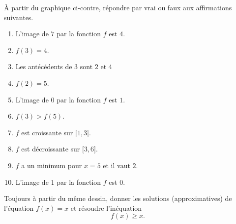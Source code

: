 
\begin{exercice}\label{exoSeconde-0069}

    \begin{multicols}{2}

À partir du graphique ci-contre, répondre par vrai ou faux aux affirmations suivantes.

\begin{enumerate}
   \item
       L'image de \( 7\) par la fonction \( f\) est \( 4\).
   \item
       \( f(3)=4\).
   \item
       Les antécédents de \( 3\) sont \( 2\) et \( 4\)
   \item
       \( f(2)=5\).
   \item
       L'image de \( 0\) par la fonction \( f\) est \( 1\).
   \item
       \( f(3)>f(5)\).
   \item
       \( f\) est croissante sur \( \mathopen[ 1 , 3 \mathclose]\).
   \item
       \( f\) est décroissante sur \( \mathopen[ 3 , 6 \mathclose]\).
    \item
        \( f\) a un minimum pour \( x=5\) et il vaut \( 2\).
    \item
       L'image de \( 1\) par la fonction \( f\) est \( 0\).
\end{enumerate}

\columnbreak




    \end{multicols}

Toujours à partir du même dessin, donner les solutions (approximatives) de l'équation \( f(x)=x\) et résoudre l'inéquation
\begin{equation}
    f(x)\geq x.
\end{equation}


\end{exercice}
